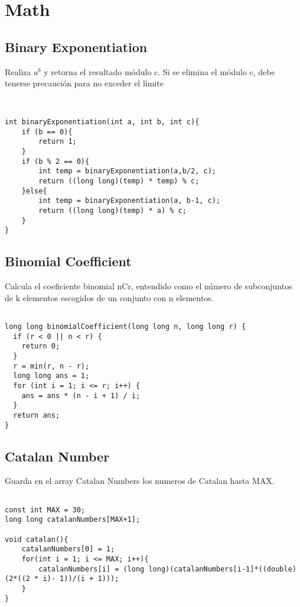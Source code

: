 \documentclass[11pt,letterpaper,twocolumn,twosided]{article}
\begin{document}
\section{Math}

\subsection{Binary Exponentiation}
Realiza $a^{b}$ y retorna el resultado m\'odulo c. Si se elimina el m\'odulo c, debe tenerse precauci\'on para no exceder el l\'imite
\begin{lstlisting}


int binaryExponentiation(int a, int b, int c){
    if (b == 0){
    	return 1;
    } 
    if (b % 2 == 0){
        int temp = binaryExponentiation(a,b/2, c);
        return ((long long)(temp) * temp) % c;
    }else{
        int temp = binaryExponentiation(a, b-1, c);
        return ((long long)(temp) * a) % c;
    }
}
\end{lstlisting}

\subsection{Binomial Coefficient}
Calcula el coeficiente binomial nCr, entendido como el n\'umero de subconjuntos de k elementos escogidos de un conjunto con n elementos.
\begin{lstlisting}

long long binomialCoefficient(long long n, long long r) {
  if (r < 0 || n < r) { 
  	return 0; 
  }
  r = min(r, n - r);
  long long ans = 1;
  for (int i = 1; i <= r; i++) {
    ans = ans * (n - i + 1) / i;
  }
  return ans;
}
\end{lstlisting}

\subsection{Catalan Number}
Guarda en el array Catalan Numbers los numeros de Catalan hasta MAX.
\begin{lstlisting}

const int MAX = 30;
long long catalanNumbers[MAX+1];

void catalan(){
	catalanNumbers[0] = 1;
	for(int i = 1; i <= MAX; i++){
		catalanNumbers[i] = (long long)(catalanNumbers[i-1]*((double)(2*((2 * i)- 1))/(i + 1)));
	}
}
\end{lstlisting}
\end{document}

